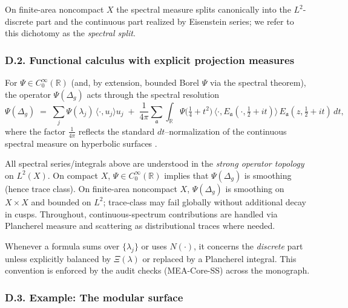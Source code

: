 \begin{definition}
On finite-area noncompact $X$ the spectral measure splits canonically into the $L^2$-discrete part and the continuous part realized by Eisenstein series; we refer to this dichotomy as the \emph{spectral split}.
\end{definition}

\subsubsection*{D.2. Functional calculus with explicit projection measures}

For $\Psi\in C_0^\infty(\mathbb{R})$ (and, by extension, bounded Borel $\Psi$ via the spectral theorem), the operator $\Psi(\Delta_g)$ acts through the spectral resolution
\[
  \Psi(\Delta_g) \;=\; \sum_{j} \Psi(\lambda_j)\,\langle \cdot, u_j\rangle u_j
  \;+\; \frac{1}{4\pi}\sum_{\mathfrak{a}}
      \int_{\mathbb{R}} \Psi\!\big(\tfrac14+t^2\big)\,
      \langle \cdot, E_{\mathfrak a}(\cdot,\tfrac12+it)\rangle\,
      E_{\mathfrak a}(z,\tfrac12+it)\,dt,
\]
where the factor $\frac{1}{4\pi}$ reflects the standard $dt$–normalization of the continuous spectral measure on hyperbolic surfaces \cite{Hejhal1983II}.

\begin{remark}
All spectral series/integrals above are understood in the \emph{strong operator topology} on $L^2(X)$.
On compact $X$, $\Psi\in C_0^\infty(\mathbb{R})$ implies that $\Psi(\Delta_g)$ is smoothing (hence trace class).
On finite-area noncompact $X$, $\Psi(\Delta_g)$ is smoothing on $X\times X$ and bounded on $L^2$; trace-class may fail globally without additional decay in cusps. Throughout, continuous-spectrum contributions are handled via Plancherel measure and scattering as distributional traces where needed.
\end{remark}

\begin{remark}
Whenever a formula sums over $\{\lambda_j\}$ or uses $N(\cdot)$, it concerns the \emph{discrete} part unless explicitly balanced by $\Xi(\lambda)$ or replaced by a Plancherel integral. This convention is enforced by the audit checks (MEA-Core-SS) across the monograph.
\end{remark}

\subsubsection*{D.3. Example: The modular surface}

